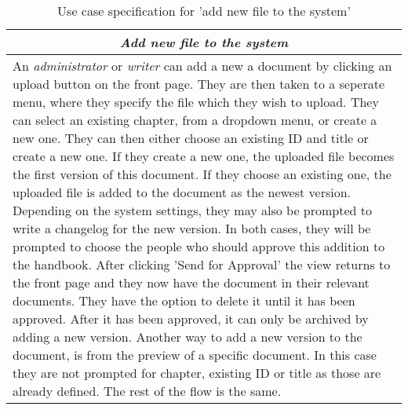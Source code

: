 \begin{table}[H]
\centering
\begin{tabular}{p{14.5cm}}
\hline
\multicolumn{1}{c}{\textit{\textbf{Add new file to the system}}} \\
\hline
An \textit{administrator} or \textit{writer} can add a new a document by clicking an upload button on the front page.
They are then taken to a seperate menu, where they specify the file which they wish to upload.
They can select an existing chapter, from a dropdown menu, or create a new one. 
They can then either choose an existing ID and title or create a new one.
If they create a new one, the uploaded file becomes the first version of this document.
If they choose an existing one, the uploaded file is added to the document as the newest version.
Depending on the system settings, they may also be prompted to write a changelog for the new version.
In both cases, they will be prompted to choose the people who should approve this addition to the handbook.
After clicking 'Send for Approval' the view returns to the front page and they now have the document in their relevant documents.
They have the option to delete it until it has been approved.
After it has been approved, it can only be archived by adding a new version.
Another way to add a new version to the document, is from the preview of a specific document.
In this case they are not prompted for chapter, existing ID or title as those are already defined.
The rest of the flow is the same.
\\\hline
\end{tabular}
\caption{Use case specification for 'add new file to the system'}\label{tab:add-file}
\end{table}
